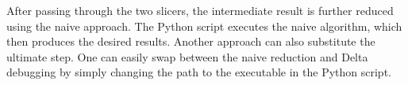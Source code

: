 After passing through the two slicers, the intermediate result is further 
reduced using the naive approach.
The Python script executes the naive algorithm, which then produces the 
desired results.
Another approach can also substitute the ultimate step.
One can easily swap between the naive reduction and Delta debugging by 
simply changing the path to the executable in the Python script.